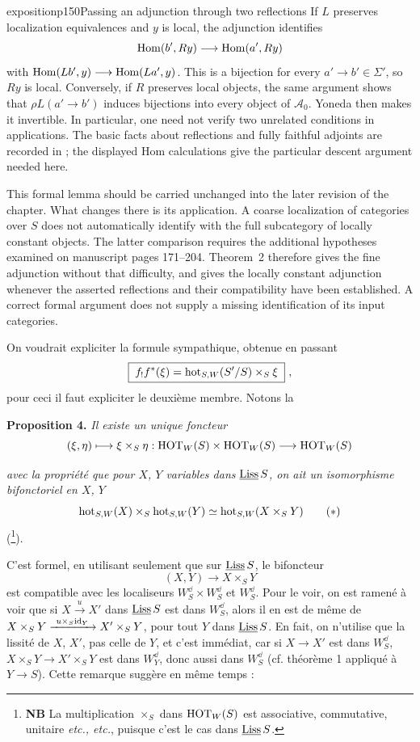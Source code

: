 \begin{dcomment}{exposition}{p150}{Passing an adjunction through two reflections}
If $L$ preserves localization equivalences and $y$ is local, the adjunction identifies
\[
 \mathrm{Hom}(b',Ry)\longrightarrow\mathrm{Hom}(a',Ry)
\]
with $\mathrm{Hom}(Lb',y)\longrightarrow\mathrm{Hom}(La',y)$. This is a bijection for every $a'\longrightarrow b'\in\Sigma'$, so $Ry$ is local. Conversely, if $R$ preserves local objects, the same argument shows that $\rho L(a'\longrightarrow b')$ induces bijections into every object of $\mathcal A_0$. Yoneda then makes it invertible. In particular, one need not verify two unrelated conditions in applications. The basic facts about reflections and fully faithful adjoints are recorded in \citet[Lemma~4.5.11 and Definition~4.5.12]{Riehl2016}; the displayed Hom calculations give the particular descent argument needed here.

This formal lemma should be carried unchanged into the later revision of the chapter. What changes there is its application. A coarse localization of categories over $S$ does not automatically identify with the full subcategory of locally constant objects. The latter comparison requires the additional hypotheses examined on manuscript pages 171--204. Theorem~2 therefore gives the fine adjunction without that difficulty, and gives the locally constant adjunction whenever the asserted reflections and their compatibility have been established. A correct formal argument does not supply a missing identification of its input categories.
\end{dcomment}


On voudrait expliciter la formule sympathique, obtenue en passant
\[
\boxed{\;f_!f^*(\xi) = \mathrm{hot}_{S,W}(S'/S) \times_S \xi\;}\ ,
\]
pour ceci il faut expliciter le deuxième membre. Notons la

\textbf{Proposition 4.} \textit{Il existe un unique foncteur}
\[
(\xi, \eta) \longmapsto \xi \times_S \eta : \mathrm{HOT}_W(S) \times \mathrm{HOT}_W(S) \longrightarrow \mathrm{HOT}_W(S)
\]



\textit{avec la propriété que pour $X$, $Y$ variables dans} $\underline{\mathrm{Liss}}\, S$\textit{, on ait un isomorphisme bifonctoriel en $X$, $Y$}
\[
\hot_{S,W}(X) \times_S \hot_{S,W}(Y) \simeq \hot_{S,W}(X \times_S Y)
\tag*{$(*)$}
\]
(\footnote[72]{\textbf{NB} La multiplication $\times_S$ dans $\mathrm{HOT}_W(S)$ est associative, commutative, unitaire \textit{etc., etc.}, puisque c'est le cas dans $\underline{\mathrm{Liss}}\, S$.}).

C'est formel, en utilisant seulement que sur $\underline{\mathrm{Liss}}\, S$, le bifoncteur
\[
(X, Y) \longrightarrow X \times_S Y
\]
est compatible avec les localiseurs $W^{\dd}_S \times W^{\dd}_S$ et $W^{\dd}_S$. Pour le voir, on est ramené à voir que si $X \xrightarrow{u} X'$ dans $\underline{\mathrm{Liss}}\, S$ est dans $W^{\dd}_S$, alors il en est de même de $X \times_S Y \xrightarrow{\ u\times_S \mathrm{id}_Y\ } X' \times_S Y$, pour tout
$Y$ dans $\underline{\mathrm{Liss}}\, S$. En fait, on n'utilise que la lissité de $X$, $X'$, pas celle de $Y$, et c'est immédiat, car si $X \longrightarrow X'$ est dans $W^{\dd}_S$, $X \times_S Y \longrightarrow X' \times_S Y$ est dans $W^{\dd}_Y$, donc aussi dans $W^{\dd}_S$ (cf. théorème 1 appliqué à $Y \longrightarrow S$). Cette remarque suggère en même temps :

